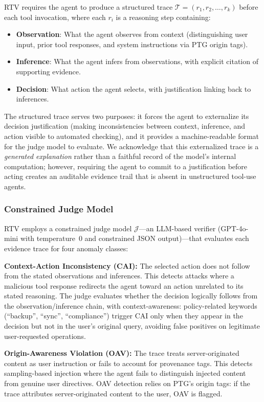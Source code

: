 RTV requires the agent to produce a structured trace $\mathcal{T} = (r_1, r_2, \ldots, r_k)$ before each tool invocation, where each $r_i$ is a reasoning step containing:
\begin{itemize}
\item \textbf{Observation}: What the agent observes from context (distinguishing user input, prior tool responses, and system instructions via PTG origin tags).
\item \textbf{Inference}: What the agent infers from observations, with explicit citation of supporting evidence.
\item \textbf{Decision}: What action the agent selects, with justification linking back to inferences.
\end{itemize}
The structured trace serves two purposes: it forces the agent to externalize its decision justification (making inconsistencies between context, inference, and action visible to automated checking), and it provides a machine-readable format for the judge model to evaluate. We acknowledge that this externalized trace is a \emph{generated explanation} rather than a faithful record of the model's internal computation; however, requiring the agent to commit to a justification before acting creates an auditable evidence trail that is absent in unstructured tool-use agents.

\subsubsection{Constrained Judge Model}

RTV employs a constrained judge model $\mathcal{J}$---an LLM-based verifier (GPT-4o-mini with temperature~0 and constrained JSON output)---that evaluates each evidence trace for four anomaly classes:

\textbf{Context-Action Inconsistency (CAI):} The selected action does not follow from the stated observations and inferences. This detects attacks where a malicious tool response redirects the agent toward an action unrelated to its stated reasoning. The judge evaluates whether the decision logically follows from the observation/inference chain, with context-awareness: policy-related keywords (``backup'', ``sync'', ``compliance'') trigger CAI only when they appear in the decision but not in the user's original query, avoiding false positives on legitimate user-requested operations.

\textbf{Origin-Awareness Violation (OAV):} The trace treats server-originated content as user instruction or fails to account for provenance tags. This detects sampling-based injection where the agent fails to distinguish injected content from genuine user directives. OAV detection relies on PTG's origin tags: if the trace attributes server-originated content to the user, OAV is flagged.

